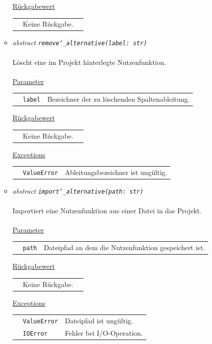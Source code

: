 \documentclass{article}
\begin{document}
\begin{itemize}
\begin{itemize}
\underline{Rückgabewert}\\
\begin{tabular}{lll}
 & Keine Rückgabe.\\
\end{tabular}


\item \textit{\flqq{}abstract\frqq} \texttt{\textit{remove\char`_alternative(label: str)}}\\\\
Löscht eine im Projekt hinterlegte Nutzenfunktion.
\\\\
\underline{Parameter}\\
\begin{tabular}{lll}
 & \texttt{label} & Bezeichner der zu löschenden Spaltenableitung.\\
\end{tabular}

\underline{Rückgabewert}\\
\begin{tabular}{lll}
 & Keine Rückgabe.\\
\end{tabular}

\underline{Exceptions}\\
\begin{tabular}{lll}
 & \texttt{ValueError} & Ableitungsbezeichner ist ungültig.\\
\end{tabular}


\item \textit{\flqq{}abstract\frqq} \texttt{\textit{import\char`_alternative(path: str)}}\\\\
Importiert eine Nutzenfunktion aus einer Datei in das Projekt.
\\\\
\underline{Parameter}\\
\begin{tabular}{lll}
 & \texttt{path} & Dateipfad an dem die Nutzenfunktion gespeichert ist.\\
\end{tabular}

\underline{Rückgabewert}\\
\begin{tabular}{lll}
 & Keine Rückgabe.\\
\end{tabular}

\underline{Exceptions}\\
\begin{tabular}{lll}
 & \texttt{ValueError} & Dateipfad ist ungültig.\\
 & \texttt{IOError} & Fehler bei I/O-Operation.\\
\end{tabular}



\end{itemize}
\end{itemize}
\end{document}
